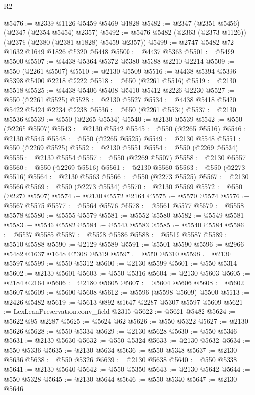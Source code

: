 \begin{lexlean}{R2}
\begin{coremodule}
@5476 := @2339 @1126 @5459 @5469 @1828
@5482 := @2347 (@2351 @5456) (@2347 (@2354 @5454) @2357)
@5492 := @5476 @5482 (@2363 (@2373 @1126)) (@2379 (@2380 (@2381 @1828) @5459 @2357))
@5499 := @2747 @5482 @72 @1632 @1649 @1826 @5320 @5448
@5500 := @4437 @5363
@5501 := @5499 @5500
@5507 := @4438 @5364 @5372 @5380 @5388 @2210 @2214
@5509 := @550 (@2261 @5507)
@5510 := @2130 @5509
@5516 := @4438 @5394 @5396 @5398 @5400 @2218 @2222
@5518 := @550 (@2261 @5516)
@5519 := @2130 @5518
@5525 := @4438 @5406 @5408 @5410 @5412 @2226 @2230
@5527 := @550 (@2261 @5525)
@5528 := @2130 @5527
@5534 := @4438 @5418 @5420 @5422 @5424 @2234 @2238
@5536 := @550 (@2261 @5534)
@5537 := @2130 @5536
@5539 := @550 (@2265 @5534)
@5540 := @2130 @5539
@5542 := @550 (@2265 @5507)
@5543 := @2130 @5542
@5545 := @550 (@2265 @5516)
@5546 := @2130 @5545
@5548 := @550 (@2265 @5525)
@5549 := @2130 @5548
@5551 := @550 (@2269 @5525)
@5552 := @2130 @5551
@5554 := @550 (@2269 @5534)
@5555 := @2130 @5554
@5557 := @550 (@2269 @5507)
@5558 := @2130 @5557
@5560 := @550 (@2269 @5516)
@5561 := @2130 @5560
@5563 := @550 (@2273 @5516)
@5564 := @2130 @5563
@5566 := @550 (@2273 @5525)
@5567 := @2130 @5566
@5569 := @550 (@2273 @5534)
@5570 := @2130 @5569
@5572 := @550 (@2273 @5507)
@5574 := @2130 @5572 @2164
@5575 := @5570 @5574
@5576 := @5567 @5575
@5577 := @5564 @5576
@5578 := @5561 @5577
@5579 := @5558 @5578
@5580 := @5555 @5579
@5581 := @5552 @5580
@5582 := @5549 @5581
@5583 := @5546 @5582
@5584 := @5543 @5583
@5585 := @5540 @5584
@5586 := @5537 @5585
@5587 := @5528 @5586
@5588 := @5519 @5587
@5589 := @5510 @5588
@5590 := @2129 @5589
@5591 := @5501 @5590
@5596 := @2966 @5482 @1637 @1648 @5308 @5319
@5597 := @550 @5310
@5598 := @2130 @5597
@5599 := @550 @5312
@5600 := @2130 @5599
@5601 := @550 @5314
@5602 := @2130 @5601
@5603 := @550 @5316
@5604 := @2130 @5603
@5605 := @2184 @2164
@5606 := @2180 @5605
@5607 := @5604 @5606
@5608 := @5602 @5607
@5609 := @5600 @5608
@5612 := @5596 (@5598 @5609) @5500
@5613 := @2426 @5482
@5619 := @5613 @892 @1647 @2287 @5307 @5597 @5609
@5621 := LexLeanPreservation.conv_field @2315
@5622 := @5621 @5482
@5624 := @5622 @95 @2287
@5625 := @5624 @62
@5626 := @550 @5322
@5627 := @2130 @5626
@5628 := @550 @5334
@5629 := @2130 @5628
@5630 := @550 @5346
@5631 := @2130 @5630
@5632 := @550 @5324
@5633 := @2130 @5632
@5634 := @550 @5336
@5635 := @2130 @5634
@5636 := @550 @5348
@5637 := @2130 @5636
@5638 := @550 @5326
@5639 := @2130 @5638
@5640 := @550 @5338
@5641 := @2130 @5640
@5642 := @550 @5350
@5643 := @2130 @5642
@5644 := @550 @5328
@5645 := @2130 @5644
@5646 := @550 @5340
@5647 := @2130 @5646

\end{coremodule}
\end{lexlean}

